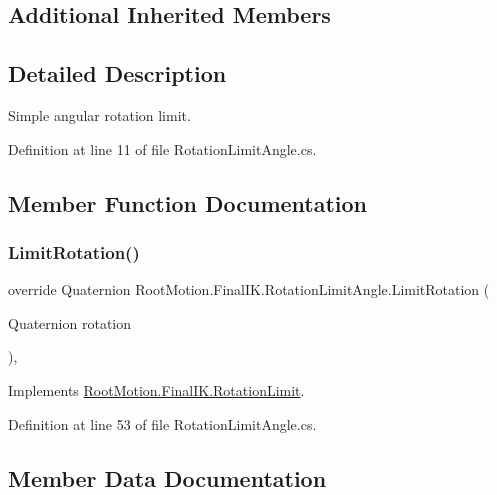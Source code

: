 \subsection*{Additional Inherited Members}


\subsection{Detailed Description}
Simple angular rotation limit. 



Definition at line 11 of file Rotation\+Limit\+Angle.\+cs.



\subsection{Member Function Documentation}
\mbox{\label{class_root_motion_1_1_final_i_k_1_1_rotation_limit_angle_af94125b5f84e83387721d12d5f9c50aa}} 
\subsubsection{\texorpdfstring{Limit\+Rotation()}{LimitRotation()}}
{\footnotesize\ttfamily override Quaternion Root\+Motion.\+Final\+I\+K.\+Rotation\+Limit\+Angle.\+Limit\+Rotation (\begin{DoxyParamCaption}\item[{Quaternion}]{rotation }\end{DoxyParamCaption})\hspace{0.3cm}{\ttfamily [protected]}, {\ttfamily [virtual]}}



Implements \mbox{\hyperlink{class_root_motion_1_1_final_i_k_1_1_rotation_limit_aebdcf7af948a0205901d2b839a76b985}{Root\+Motion.\+Final\+I\+K.\+Rotation\+Limit}}.



Definition at line 53 of file Rotation\+Limit\+Angle.\+cs.



\subsection{Member Data Documentation}
\mbox{\label{class_root_motion_1_1_final_i_k_1_1_rotation_limit_angle_a408919481a55317dabbb6a439254f12e}} 
